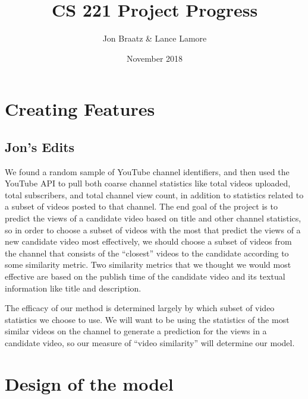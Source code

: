 \documentclass[12pt]{article}
\title{CS 221 Project Progress}
\author{Jon Braatz \& Lance Lamore}
\date{November 2018}
\theoremstyle{definition}
\theoremstyle{remark}
\begin{document}
\maketitle

  
\section{Creating Features}
\subsection{Jon's Edits}
We found a random sample of YouTube channel identifiers, and then used the
YouTube API to pull both coarse channel statistics like total videos uploaded,
total subscribers, and total channel view count, in addition to statistics
related to a subset of videos posted to that channel. The end goal of the
project is to predict the views of a candidate video based on title and other
channel statistics, so in order to choose a subset of videos with the most
that predict the views of a new candidate video most effectively, we should
choose a subset of videos from the channel that consists of the ``closest''
videos to the candidate according to some similarity metric. Two similarity
metrics that we thought we would most effective are based on the publish time of the candidate video
and its textual information like title and description. 

The efficacy of our method is determined largely by which subset of
video statistics we choose to use. We will want to be using the statistics of
the most similar videos on the channel to generate a prediction for the views in
a candidate video, so our measure of ``video similarity'' will determine our
model.

\section{Design of the model}
\end{document}
